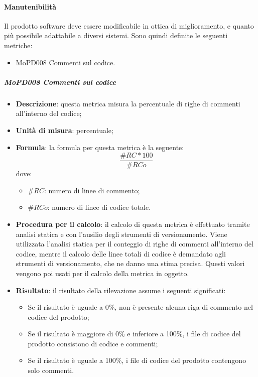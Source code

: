 \documentclass[../norme-di-progetto.tex]{subfiles}
\begin{document}
\paragraph{Manutenibilità}
Il prodotto software deve essere modificabile in ottica di miglioramento, e quanto più possibile adattabile a diversi sistemi. Sono quindi definite le seguenti metriche:
\begin{itemize}
  \item MoPD008 Commenti sul codice.
\end{itemize}
\subparagraph{MoPD008 Commenti sul codice}
\begin{itemize}
  \item \textbf{Descrizione}: questa metrica misura la percentuale di righe di commenti all'interno del codice;
  \item \textbf{Unità di misura}: percentuale;
  \item \textbf{Formula}: la formula per questa metrica è la seguente:
  \begin{displaymath}
    \frac{\#RC * 100}{\#RCo}
  \end{displaymath}
  dove:
  \begin{itemize}
    \item $ \#RC $: numero di linee di commento;
    \item $ \#RCo $: numero di linee di codice totale.
  \end{itemize}
  \item \textbf{Procedura per il calcolo}: il calcolo di questa metrica è effettuato tramite analisi statica e con l'ausilio degli strumenti di versionamento. Viene utilizzata l'analisi statica per il conteggio di righe di commenti all'interno del codice, mentre il calcolo delle linee totali di codice è demandato agli strumenti di versionamento, che ne danno una stima precisa. Questi valori vengono poi usati per il calcolo della metrica in oggetto.
  \item \textbf{Risultato}: il risultato della rilevazione assume i seguenti significati:
  \begin{itemize}
    \item Se il risultato è uguale a 0\%, non è presente alcuna riga di commento nel codice del prodotto;
    \item Se il risultato è maggiore di 0\% e inferiore a 100\%, i file di codice del prodotto consistono di codice e commenti;
    \item Se il risultato è uguale a 100\%, i file di codice del prodotto contengono solo commenti.
  \end{itemize}
\end{itemize}


\newpage
\end{document}
